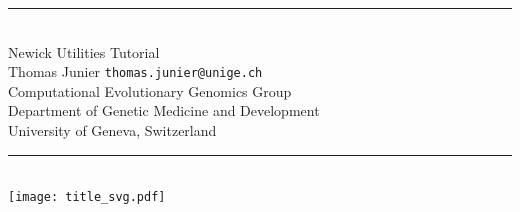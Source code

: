 \documentclass[a4paper,10pt]{report}
\theoremstyle{definition}
\theoremstyle{definition}
\newcommand{\Hrule}[1]{\rule{\linewidth}{#1}}
\begin{document}
\begin{titlepage}
\begin{center}
\Hrule{0.5mm} \\[0.8cm]
{\Huge Newick Utilities Tutorial} \\[0.5cm]
Thomas Junier \texttt{thomas.junier@unige.ch} \\
Computational Evolutionary Genomics Group \\
Department of Genetic Medicine and Development \\
University of Geneva, Switzerland
\Hrule{0.5mm}
%
\\[2cm]
\texttt{[image: title\_svg.pdf]}
\end{center}
\end{titlepage}

\tableofcontents









\appendix







% 

% 
\end{document}
